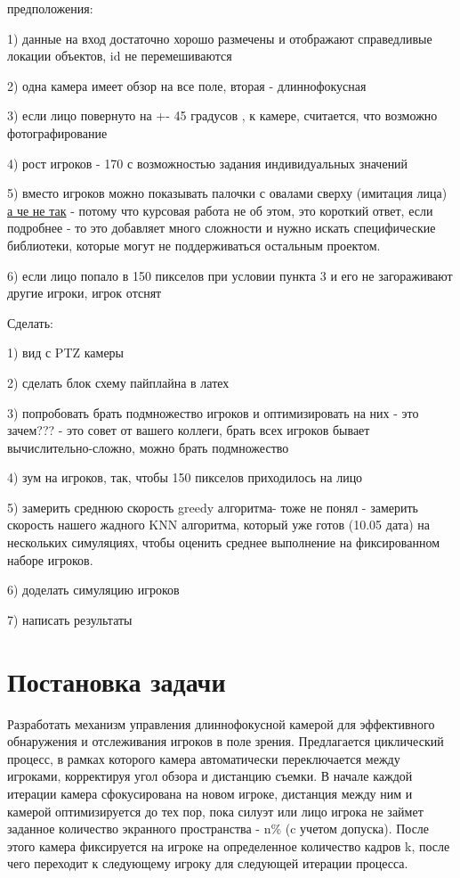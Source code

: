 предположения:

1) данные на вход достаточно хорошо размечены и отображают справедливые локации объектов, id не перемешиваются

2) одна камера имеет обзор на все поле, вторая - длиннофокусная

3) если лицо повернуто на +- 45 градусов , к камере, считается, что возможно фотографирование

4) рост игроков - 170 с возможностью задания индивидуальных значений 

5) вместо игроков можно показывать палочки с овалами сверху (имитация лица) \href{https://www.google.com/search?q=siluette+socer&oq=siluette+socer&aqs=chrome..69i57j0i13i512l9.8195j0j15&sourceid=chrome&ie=UTF-8#vhid=VlKJM8sBEGAFAM&vssid=l}{а че не так} - потому что курсовая работа не об этом, это короткий ответ, если подробнее - то это добавляет много сложности и нужно искать специфические библиотеки, которые могут не поддерживаться остальным проектом.

6) если лицо попало в 150 пикселов при условии пункта 3 и его не загораживают другие игроки, игрок отснят

Сделать:

1) вид с PTZ  камеры  

2) сделать блок схему пайплайна  в латех

3) попробовать брать подмножество игроков и оптимизировать на них - это зачем??? - это совет от вашего коллеги, брать всех игроков бывает вычислительно-сложно, можно брать подмножество

4) зум на игроков, так, чтобы 150 пикселов приходилось на лицо

5) замерить среднюю скорость greedy алгоритма- тоже не понял - замерить скорость нашего жадного KNN алгоритма, который уже готов (10.05 дата) на нескольких симуляциях, чтобы оценить среднее выполнение на фиксированном наборе игроков.

6) доделать симуляцию игроков

7) написать результаты



\section{Постановка задачи}

Разработать механизм управления длиннофокусной камерой для эффективного обнаружения и отслеживания игроков в поле зрения. Предлагается циклический процесс, в рамках которого камера автоматически переключается между игроками, корректируя угол обзора и дистанцию съемки. В начале каждой итерации камера сфокусирована на новом игроке, дистанция между ним и камерой оптимизируется до тех пор, пока силуэт или лицо игрока не займет заданное количество экранного пространства - n\% (c учетом допуска). После этого камера фиксируется на игроке на определенное количество кадров k, после чего переходит к следующему игроку для следующей итерации процесса.

